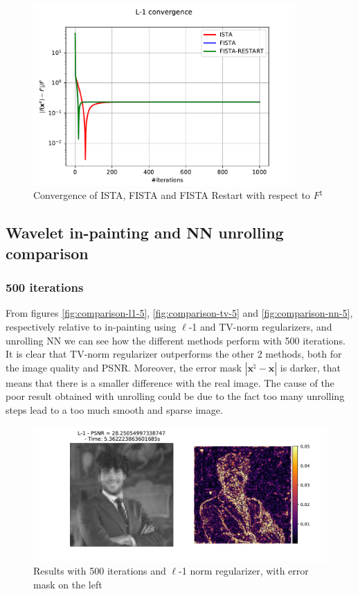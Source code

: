 \documentclass[12pt]{article}
\begin{document}
\begin{figure}[H]
    \centering
    \includegraphics[width=10cm]{hw3/codes/exercise2/results/f_natural_convergence.pdf}
    \caption{Convergence of ISTA, FISTA and FISTA Restart with respect to $F^\natural$}
    \label{fig:f-natural-convergence}
\end{figure}

\subsection{Wavelet in-painting and NN unrolling comparison}
\subsubsection{500 iterations}
From figures \ref{fig:comparison-l1-5}, \ref{fig:comparison-tv-5} and \ref{fig:comparison-nn-5}, respectively relative to in-painting using $\ell$-1 and TV-norm regularizers, and unrolling NN we can see how the different methods perform with 500 iterations. It is clear that TV-norm regularizer outperforms the other 2 methods, both for the image quality and PSNR. Moreover, the error mask $|\mathbf{x}^{\natural} - \mathbf{x}|$ is darker, that means that there is a smaller difference with the real image. The cause of the poor result obtained with unrolling could be due to the fact too many unrolling steps lead to a too much smooth and sparse image.

\begin{figure}[H]
    \centering
    \includegraphics[width=12cm]{hw3/codes/exercise2/results/comparisons/me_comparison_l1_500.pdf}
    \caption{Results with 500 iterations and $\ell$-1 norm regularizer, with error mask on the left}
    \label{fig:comparison-l1-500}
\end{figure}
\end{document}
